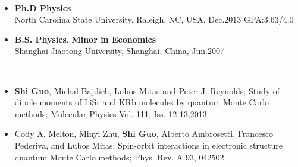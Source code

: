 \documentclass[11pt]{article} %
\begin{document}
\vspace{2mm}

 
 \\
\vspace{-5mm}

\begin{itemize}
  \item {\bf Ph.D Physics} \hspace{100mm}   \\
    North Carolina State University, Raleigh, NC, USA, Dec.2013   \hspace*{10mm}GPA:3.63/4.0\\
\vspace{-4mm}
  \item {\bf B.S. Physics}, {\bf Minor in Economics}\\
    Shanghai Jiaotong University, Shanghai, China, Jun.2007\\
\vspace{-4mm}
\end{itemize}

\vspace{1mm}
\\
\vspace{-4mm}
\begin{itemize}
  \item {\bf Shi Guo}, Michal Bajdich, Lubos Mitas and Peter J. Reynolds;
Study of dipole moments of LiSr and KRb molecules by quantum Monte Carlo methods;
Molecular Physics Vol. 111, Iss. 12-13,2013
  \item Cody A. Melton, Minyi Zhu, {\bf Shi Guo}, Alberto Ambrosetti, Francesco Pederiva, and Lubos Mitas;
Spin-orbit interactions in electronic structure quantum Monte Carlo methods;
Phys. Rev. A 93, 042502
\end{itemize}
\vspace{-12mm}  
\end{document}

